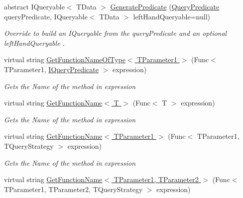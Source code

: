 \begin{DoxyCompactItemize}
abstract I\+Queryable$<$ T\+Data $>$ \hyperlink{classCqrs_1_1Repositories_1_1Queries_1_1QueryBuilder_aa38989a8b4808c7c73e7cf038b535ea7_aa38989a8b4808c7c73e7cf038b535ea7}{Generate\+Predicate} (\hyperlink{classCqrs_1_1Repositories_1_1Queries_1_1QueryPredicate}{Query\+Predicate} query\+Predicate, I\+Queryable$<$ T\+Data $>$ left\+Hand\+Queryable=null)
\begin{DoxyCompactList}\small\item\em Override to build an I\+Queryable from the {\itshape query\+Predicate}  and an optional {\itshape left\+Hand\+Queryable} . \end{DoxyCompactList}\item 
virtual string \hyperlink{classCqrs_1_1Repositories_1_1Queries_1_1QueryBuilder_a09b5db1f6e86d02c04f132080e88aa38_a09b5db1f6e86d02c04f132080e88aa38}{Get\+Function\+Name\+Of\+Type$<$ T\+Parameter1 $>$} (Func$<$ T\+Parameter1, \hyperlink{interfaceCqrs_1_1Repositories_1_1Queries_1_1IQueryPredicate}{I\+Query\+Predicate} $>$ expression)
\begin{DoxyCompactList}\small\item\em Gets the Name of the method in {\itshape expression}  \end{DoxyCompactList}\item 
virtual string \hyperlink{classCqrs_1_1Repositories_1_1Queries_1_1QueryBuilder_a2fce57b724f5443ea75e2f17ae07d401_a2fce57b724f5443ea75e2f17ae07d401}{Get\+Function\+Name$<$ T $>$} (Func$<$ T $>$ expression)
\begin{DoxyCompactList}\small\item\em Gets the Name of the method in {\itshape expression}  \end{DoxyCompactList}\item 
virtual string \hyperlink{classCqrs_1_1Repositories_1_1Queries_1_1QueryBuilder_ace3bdd5bf69a3d56f2e1ec19e75bf2cf_ace3bdd5bf69a3d56f2e1ec19e75bf2cf}{Get\+Function\+Name$<$ T\+Parameter1 $>$} (Func$<$ T\+Parameter1, T\+Query\+Strategy $>$ expression)
\begin{DoxyCompactList}\small\item\em Gets the Name of the method in {\itshape expression}  \end{DoxyCompactList}\item 
virtual string \hyperlink{classCqrs_1_1Repositories_1_1Queries_1_1QueryBuilder_a45c4e9123301de6f5b3cdd41c79e86ab_a45c4e9123301de6f5b3cdd41c79e86ab}{Get\+Function\+Name$<$ T\+Parameter1, T\+Parameter2 $>$} (Func$<$ T\+Parameter1, T\+Parameter2, T\+Query\+Strategy $>$ expression)

\end{DoxyCompactItemize}
